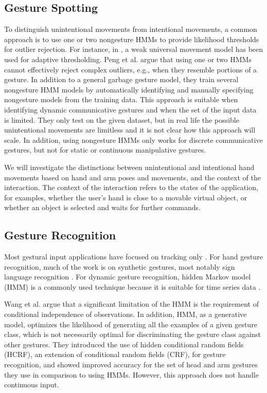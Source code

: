 \subsection{Gesture Spotting}
To distinguish unintentional movements from intentional
movements, a common approach is to use one or two nongesture HMMs to
provide likelihood thresholds for outlier rejection. For instance, in \cite{yang07}, a weak
universal movement model has been used for adaptive thresholding.
Peng et al. \cite{peng11} argue that using one or two HMMs cannot
effectively reject complex outliers, e.g., when they resemble portions of a
gesture. In addition to a general garbage gesture model, they train several
nongesture HMM models by automatically identifying and manually specifying nongesture models from the
training data. This approach is suitable when identifying dynamic communicative
gestures and when the set of the input data is limited. They only test on the
given dataset, but in real life the possible unintentional movements are
limitless and it is not clear how this approach will scale. In addition,
using nongesture HMMs only works for discrete communicative gestures, but not
for static or continuous manipulative gestures.

We will investigate the distinctions between unintentional and
intentional hand movements based on hand and arm poses and movements, and the
context of the interaction. The context of the interaction refers to the states
of the application, for examples, whether the user's hand is close to a movable
virtual object, or whether an object is selected and waits for further commands.

\subsection{Gesture Recognition}
Most gestural input applications have focused on tracking only
\cite{harrison11} \cite{larson11}. For hand gesture recognition, much of the
work is on synthetic gestures, most notably sign language recognition
\cite{Starner95} \cite{Bauer00} \cite{kadous02} \cite{Wang09}. For dynamic
gesture recognition, hidden Markov model (HMM) is a commonly used technique because it is suitable
for time series data \cite{sharma00}.

Wang et al. \cite{wang06} argue that a significant limitation of the
HMM is the requirement of conditional independence of observations. In
addition, HMM, as a generative model, optimizes the likelihood of
generating all the examples of a given gesture class, which is not
necessarily optimal for discriminating the gesture class against other
gestures. They introduced the use of hidden conditional random fields (HCRF),
an extension of conditional random fields (CRF), for gesture recognition, and
showed improved accuracy for the set of head and arm gestures they use in comparison to using HMMs. 
However, this approach does not handle continuous input. 

